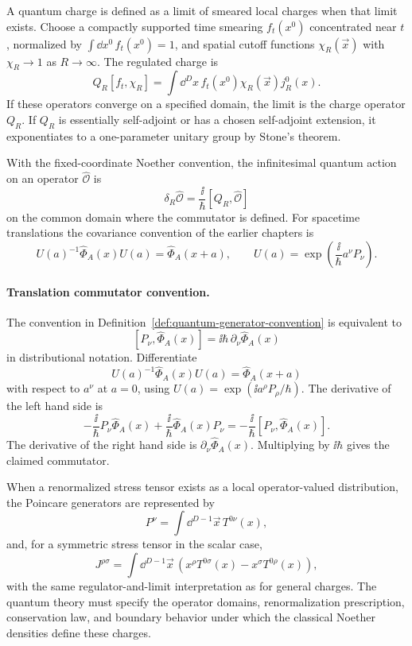 \begin{definition}
\label{def:quantum-charge-smeared-limit}
A quantum charge is defined as a limit of smeared local charges when that
limit exists.  Choose a compactly supported time smearing \(f_t(x^0)\)
concentrated near \(t\), normalized by
\(\int\dd x^0\,f_t(x^0)=1\), and spatial cutoff functions
\(\chi_R(\vec x)\) with \(\chi_R\to1\) as \(R\to\infty\).  The regulated
charge is
\[
  Q_R[f_t,\chi_R]
  =
  \int\dd^Dx\,f_t(x^0)\chi_R(\vec x)j_R^0(x).
\]
If these operators converge on a specified domain, the limit is the charge
operator \(Q_R\).  If \(Q_R\) is essentially self-adjoint or has a chosen
self-adjoint extension, it exponentiates to a one-parameter unitary group by
Stone's theorem.
\end{definition}

\begin{definition}
\label{def:quantum-generator-convention}
With the fixed-coordinate Noether convention, the infinitesimal quantum action
on an operator \(\widehat{\mathcal O}\) is
\[
  \delta_R\widehat{\mathcal O}
  =
  \frac{\ii}{\hbar}
  [Q_R,\widehat{\mathcal O}]
\]
on the common domain where the commutator is defined.  For spacetime
translations the covariance convention of the earlier chapters is
\[
  U(a)^{-1}\widehat\Phi_A(x)U(a)
  =
  \widehat\Phi_A(x+a),
  \qquad
  U(a)=\exp\left(\frac{\ii}{\hbar}a^\nu P_\nu\right).
\]
\end{definition}

\paragraph{Translation commutator convention.}
The convention in Definition~\ref{def:quantum-generator-convention} is
equivalent to
\[
  [P_\nu,\widehat\Phi_A(x)]
  =
  \ii\hbar\,\partial_\nu\widehat\Phi_A(x)
\]
in distributional notation.
Differentiate
\[
  U(a)^{-1}\widehat\Phi_A(x)U(a)=\widehat\Phi_A(x+a)
\]
with respect to \(a^\nu\) at \(a=0\), using
\(U(a)=\exp(\ii a^\rho P_\rho/\hbar)\).  The derivative of the left hand side
is
\[
  -\frac{\ii}{\hbar}P_\nu\widehat\Phi_A(x)
  +
  \frac{\ii}{\hbar}\widehat\Phi_A(x)P_\nu
  =
  -\frac{\ii}{\hbar}[P_\nu,\widehat\Phi_A(x)].
\]
The derivative of the right hand side is
\(\partial_\nu\widehat\Phi_A(x)\).  Multiplying by \(\ii\hbar\) gives the
claimed commutator.

\begin{definition}
\label{def:quantum-stress-tensor-charges}
When a renormalized stress tensor exists as a local operator-valued
distribution, the Poincare generators are represented by
\[
  P^\nu=\int\dd^{D-1}\vec x\,T^{0\nu}(x),
\]
and, for a symmetric stress tensor in the scalar case,
\[
  J^{\rho\sigma}
  =
  \int\dd^{D-1}\vec x\,
  \left(
    x^\rho T^{0\sigma}(x)-x^\sigma T^{0\rho}(x)
  \right),
\]
with the same regulator-and-limit interpretation as for general charges.
The quantum theory must specify the operator domains, renormalization
prescription, conservation law, and boundary behavior under which the
classical Noether densities define these charges.
\end{definition}

